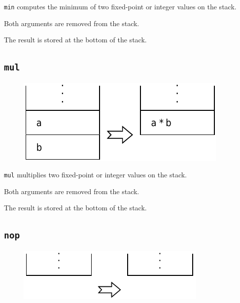 			\texttt{min} computes the minimum of two fixed-point or integer
			values on the stack. 
	
			Both arguments are removed from the stack. 
	
			The result is stored at the bottom of the stack.
	
	\qquad
	
	\subsection*{\texttt{mul}}
	
		\begin{figure}
			\begin{flushright}
				\includegraphics[width=\linewidth]{figure/pdf/i_mul} 
			\end{flushright}
		\end{figure}
	
			\texttt{mul} multiplies two fixed-point or integer values on the
			stack.
			
			Both arguments are removed from the stack.
			
			The result is stored at the bottom of the stack.
	
	\qquad
	
	\subsection*{\texttt{nop}}
	
		\begin{figure}
			\begin{flushright}
				\includegraphics[width=\linewidth]{figure/pdf/i_nop} 
			\end{flushright}
		\end{figure}
	

